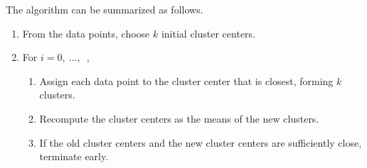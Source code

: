 The algorithm can be summarized as follows.
\begin{enumerate}
    \item From the data points, choose $k$ initial cluster centers.
    \item For $i=0,\ \ldots,$\ ,
    \begin{enumerate}
        \item Assign each data point to the cluster center that is closest, forming $k$ clusters.
        \item Recompute the cluster centers as the means of the new clusters.
        \item If the old cluster centers and the new cluster centers are sufficiently close, terminate early.
    \end{enumerate}
\end{enumerate}


%    	 
%   

